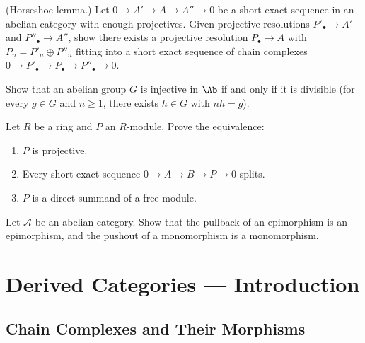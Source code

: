 \begin{exercise}\label{exo:horseshoe}
(Horseshoe lemma.) Let $0 \to A' \to A \to A'' \to 0$ be a short exact sequence in an
abelian category with enough projectives. Given projective resolutions
$P'_\bullet \to A'$ and $P''_\bullet \to A''$, show there exists a projective resolution
$P_\bullet \to A$ with $P_n = P'_n \oplus P''_n$ fitting into a short exact sequence
of chain complexes $0 \to P'_\bullet \to P_\bullet \to P''_\bullet \to 0$.
\end{exercise}

\begin{exercise}\label{exo:injective-divisible}
Show that an abelian group $G$ is injective in $\Ab$ if and only if it is divisible
(for every $g \in G$ and $n \geq 1$, there exists $h \in G$ with $nh = g$).
\end{exercise}

\begin{exercise}\label{exo:projective-characterization}
Let $R$ be a ring and $P$ an $R$-module. Prove the equivalence:
\begin{enumerate}
    \item $P$ is projective.
    \item Every short exact sequence $0 \to A \to B \to P \to 0$ splits.
    \item $P$ is a direct summand of a free module.
\end{enumerate}
\end{exercise}

\begin{exercise}\label{exo:abelian-pullback}
Let $\mathcal{A}$ be an abelian category. Show that the pullback of an epimorphism is
an epimorphism, and the pushout of a monomorphism is a monomorphism.
\end{exercise}


\chapter{Derived Categories --- Introduction}\label{ch:derived}
\minitoc

\section{Chain Complexes and Their Morphisms}\label{sec:chain-complexes}

